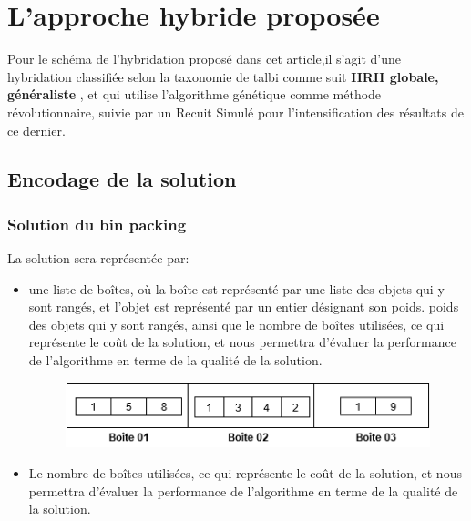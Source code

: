 \documentclass[preprint]{elsarticle}
\begin{document}
\section{L'approche hybride proposée}
Pour le schéma de l’hybridation proposé dans cet article,il s’agit d’une hybridation  classifiée selon la taxonomie de talbi comme suit 
\textbf{HRH globale, généraliste }, et qui utilise l'algorithme génétique comme méthode révolutionnaire,
suivie par un  Recuit Simulé pour l'intensification des résultats de ce dernier.

\subsection{Encodage de la solution}
\subsubsection{Solution du bin packing}
La solution sera représentée par: 
\begin{itemize}
    \item une liste de boîtes, où la boîte est représenté par une liste des objets qui y sont rangés, et l’objet est représenté par un entier désignant son poids.  poids des objets qui y sont rangés, ainsi que le nombre de boîtes utilisées, ce qui représente le coût de la solution, et nous permettra  d’évaluer la performance de l’algorithme en terme de la qualité de la solution.
    \begin{figure}[h!]
        \centering
        \includegraphics[scale=0.6]{./figures/Untitled Diagram(6).png}
    \end{figure}
    \item Le nombre de boîtes utilisées, ce qui représente le coût de la solution, et nous permettra  d’évaluer la performance de l’algorithme en terme de la qualité de la solution.

\end{itemize}
\end{document}

